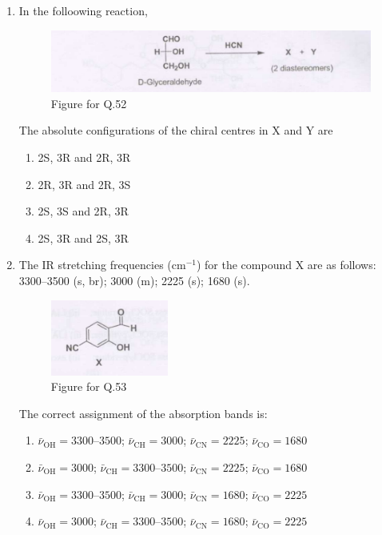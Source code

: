 \documentclass[12pt]{article}
\begin{document}
\begin{enumerate}
\item In the folloowing reaction,

\begin{figure}[H]
\includegraphics[width=0.6\columnwidth]{figs/q52.png}
\caption{Figure for Q.52}
    \label{fig:q52}
\end{figure}

 The absolute configurations of the chiral centres in X and Y are

\begin{enumerate}
\item  2S, 3R  and  2R, 3R 
\item  2R, 3R  and  2R, 3S 
\item  2S, 3S  and  2R, 3R 
\item  2S, 3R  and  2S, 3R
\end{enumerate}    \hfill{}


\item The IR stretching frequencies (cm$^{-1}$) for the compound X are as follows: 3300--3500 (s, br); 3000 (m); 2225 (s); 1680 (s). 

\begin{figure}[H]
\includegraphics[width=0.6\columnwidth]{figs/q53.png}
\caption{Figure for Q.53}
    \label{fig:q53}
\end{figure}

The correct assignment of the absorption bands is:

\begin{enumerate}
\item  $\bar{\nu}_{\text{OH}} = 3300$--$3500$; $\bar{\nu}_{\text{CH}} = 3000$; $\bar{\nu}_{\text{CN}} = 2225$; $\bar{\nu}_{\text{CO}} = 1680$ 
\item  $\bar{\nu}_{\text{OH}} = 3000$; $\bar{\nu}_{\text{CH}} = 3300$--$3500$; $\bar{\nu}_{\text{CN}} = 2225$; $\bar{\nu}_{\text{CO}} = 1680$ 
\item  $\bar{\nu}_{\text{OH}} = 3300$--$3500$; $\bar{\nu}_{\text{CH}} = 3000$; $\bar{\nu}_{\text{CN}} = 1680$; $\bar{\nu}_{\text{CO}} = 2225$ 
\item  $\bar{\nu}_{\text{OH}} = 3000$; $\bar{\nu}_{\text{CH}} = 3300$--$3500$; $\bar{\nu}_{\text{CN}} = 1680$; $\bar{\nu}_{\text{CO}} = 2225$
\end{enumerate}    \hfill{}



\end{enumerate}
\end{document}
